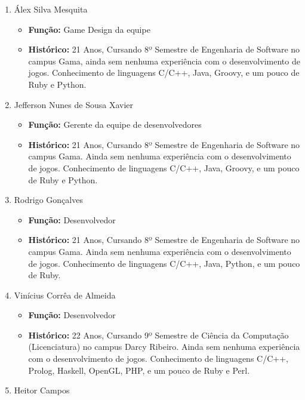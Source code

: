 \documentclass[a4paper, 11pt]{article} %
\begin{document}
\begin{enumerate}
\item Álex Silva Mesquita

\begin{itemize}
\item \textbf{Função:} Game Design da equipe
\item \textbf{Histórico:} 21 Anos, Cursando 8º Semestre de Engenharia de Software no campus Gama, ainda sem nenhuma experiência com o desenvolvimento de jogos. Conhecimento de linguagens C/C++, Java, Groovy, e um pouco de Ruby e Python.
\end{itemize}

\item Jefferson Nunes de Sousa Xavier

\begin{itemize}
\item \textbf{Função:} Gerente da equipe de desenvolvedores
\item \textbf{Histórico:} 21 Anos, Cursando 8º Semestre de Engenharia de Software no campus Gama. Ainda sem nenhuma experiência com o desenvolvimento de jogos. Conhecimento de linguagens C/C++, Java, Groovy, e um pouco de Ruby e Python.
\end{itemize}

\item Rodrigo Gonçalves

\begin{itemize}
\item \textbf{Função:} Desenvolvedor
\item \textbf{Histórico:} 21 Anos, Cursando 8º Semestre de Engenharia de Software no campus Gama. Ainda sem nenhuma experiência com o desenvolvimento de jogos. Conhecimento de linguagens C/C++, Java, Python, e um pouco de Ruby.
\end{itemize}

\item Vinícius Corrêa de Almeida

\begin{itemize}
\item \textbf{Função:} Desenvolvedor
\item \textbf{Histórico:} 22 Anos, Cursando 9º Semestre de Ciência da Computação (Licenciatura) no campus Darcy Ribeiro. Ainda sem nenhuma experiência com o desenvolvimento de jogos. Conhecimento de linguagens C/C++, Prolog, Haskell, OpenGL, PHP, e um pouco de Ruby e Perl.
\end{itemize}

\item Heitor Campos


\end{enumerate}
\end{document}
